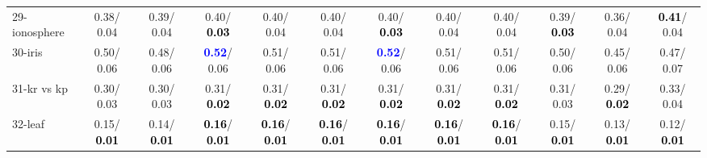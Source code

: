 \begin{table}[h]
\begin{center}
{\begin{tabular}{lc|c|c|c|c|c|c|c|c|c|c}
29-ionosphere &   0.38/  0.04 &   0.39/  0.04 &   0.40/\textcolor{black}{\textbf{  0.03}} &   0.40/  0.04 &   0.40/  0.04 &   0.40/\textcolor{black}{\textbf{  0.03}} &   0.40/  0.04 &   0.40/  0.04 &   0.39/\textcolor{black}{\textbf{  0.03}} &   0.36/  0.04 & \textcolor{black}{\textbf{  0.41}}/  0.04 \\
30-iris &   0.50/  0.06 &   0.48/  0.06 & \textcolor{blue}{\textbf{  0.52}}/  0.06 &   0.51/  0.06 &   0.51/  0.06 & \textcolor{blue}{\textbf{  0.52}}/  0.06 &   0.51/  0.06 &   0.51/  0.06 &   0.50/  0.06 &   0.45/  0.06 &   0.47/  0.07 \\
31-kr vs kp &   0.30/  0.03 &   0.30/  0.03 &   0.31/\textcolor{black}{\textbf{  0.02}} &   0.31/\textcolor{black}{\textbf{  0.02}} &   0.31/\textcolor{black}{\textbf{  0.02}} &   0.31/\textcolor{black}{\textbf{  0.02}} &   0.31/\textcolor{black}{\textbf{  0.02}} &   0.31/\textcolor{black}{\textbf{  0.02}} &   0.31/  0.03 &   0.29/\textcolor{black}{\textbf{  0.02}} &   0.33/  0.04 \\
32-leaf &   0.15/\textcolor{black}{\textbf{  0.01}} &   0.14/\textcolor{black}{\textbf{  0.01}} & \textcolor{black}{\textbf{  0.16}}/\textcolor{black}{\textbf{  0.01}} & \textcolor{black}{\textbf{  0.16}}/\textcolor{black}{\textbf{  0.01}} & \textcolor{black}{\textbf{  0.16}}/\textcolor{black}{\textbf{  0.01}} & \textcolor{black}{\textbf{  0.16}}/\textcolor{black}{\textbf{  0.01}} & \textcolor{black}{\textbf{  0.16}}/\textcolor{black}{\textbf{  0.01}} & \textcolor{black}{\textbf{  0.16}}/\textcolor{black}{\textbf{  0.01}} &   0.15/\textcolor{black}{\textbf{  0.01}} &   0.13/\textcolor{black}{\textbf{  0.01}} &   0.12/\textcolor{black}{\textbf{  0.01}} \\\end{tabular}
}\label{strats0aCIELM}
\end{center}
\end{table}
